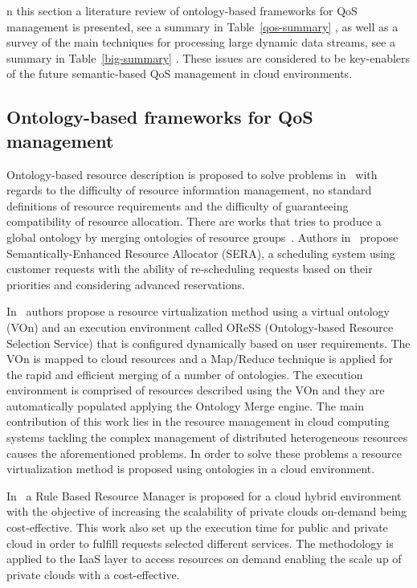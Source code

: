 n this section a literature review of ontology-based frameworks for QoS management is presented, see a summary in Table~\ref{qos-summary} , as well as a survey of the 
main techniques for processing large dynamic data streams, see a summary in Table~\ref{big-summary} . These issues are considered to be key-enablers of the future 
semantic-based QoS management in cloud environments.
\subsection{Ontology-based frameworks for QoS management}
Ontology-based resource description is proposed to solve problems in~\cite{Pernas:2005:UOD:1068510.1069326,Armstrong17} with regards to the difficulty of 
resource information management, no standard definitions of resource requirements and the difficulty of guaranteeing compatibility of resource allocation. 
There are works that tries to produce a global ontology by merging ontologies of resource groups~\cite{Lopes:2006:PEM:1135771.1136110}. 
Authors in~\cite{Ejarque:2008:USR:1443230.1444322} propose Semantically-Enhanced Resource Allocator (SERA), a scheduling system using customer 
requests with the ability of re-scheduling requests based on their priorities and considering advanced reservations.

In~\cite{2009gdc..conf..221Y} authors propose a resource virtualization method using a virtual ontology (VOn) and an execution environment called OReSS 
(Ontology-based Resource Selection Service) that is configured dynamically based on user requirements. The VOn is mapped to cloud resources 
and a Map/Reduce technique is applied for the rapid and efficient merging of a number of ontologies. The execution environment is comprised of resources 
described using the VOn and they are automatically populated applying the Ontology Merge engine. The main contribution of this work lies in 
the resource management in cloud computing systems tackling the complex management of distributed heterogeneous resources causes the aforementioned problems. 
In order to solve these problems a resource virtualization method is proposed using ontologies in a cloud environment. 

In~\cite{rule-2013-resource-provisioning} a Rule Based Resource Manager is proposed for a cloud hybrid environment with the objective of increasing the scalability of private 
clouds on-demand being cost-effective. This work also set up the execution time for public and private cloud in order to fulfill requests selected different services. 
The methodology is applied to the IaaS layer to access resources on demand enabling the scale up of private clouds with a cost-effective.

